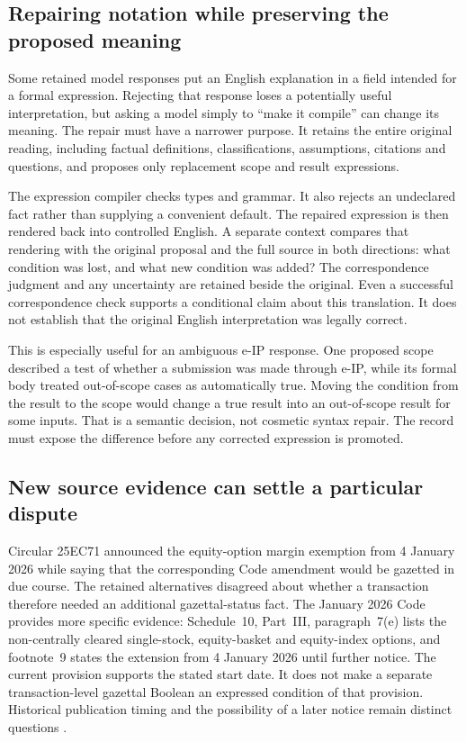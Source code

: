 \documentclass[12pt,a4paper,oneside,openany]{book}
\begin{document}
\subsection{Repairing notation while preserving the proposed meaning}

Some retained model responses put an English explanation in a field intended
for a formal expression. Rejecting that response loses a potentially useful
interpretation, but asking a model simply to ``make it compile'' can change its
meaning. The repair must have a narrower purpose. It retains the entire original
reading, including factual definitions, classifications, assumptions, citations
and questions, and proposes only replacement scope and result expressions.

The expression compiler checks types and grammar. It also rejects an undeclared
fact rather than supplying a convenient default. The repaired expression is
then rendered back into controlled English. A separate context compares that
rendering with the original proposal and the full source in both directions:
what condition was lost, and what new condition was added? The correspondence
judgment and any uncertainty are retained beside the original. Even a successful
correspondence check supports a conditional claim about this translation. It
does not establish that the original English interpretation was legally correct.

This is especially useful for an ambiguous e-IP response. One proposed scope
described a test of whether a submission was made through e-IP, while its formal
body treated out-of-scope cases as automatically true. Moving the condition from
the result to the scope would change a true result into an out-of-scope result
for some inputs. That is a semantic decision, not cosmetic syntax repair. The
record must expose the difference before any corrected expression is promoted.

\subsection{New source evidence can settle a particular dispute}

Circular 25EC71 announced the equity-option margin exemption from 4 January
2026 while saying that the corresponding Code amendment would be gazetted in
due course. The retained alternatives disagreed about whether a transaction
therefore needed an additional gazettal-status fact. The January 2026 Code
provides more specific evidence: Schedule~10, Part~III, paragraph~7(e) lists the
non-centrally cleared single-stock, equity-basket and equity-index options, and
footnote~9 states the extension from 4 January 2026 until further notice.
The current provision supports the stated start date. It does not make a
separate transaction-level gazettal Boolean an expressed condition of that
provision. Historical publication timing and the possibility of a later notice
remain distinct questions \citep{sfcmargin2025,sfccode2026}.
\end{document}
